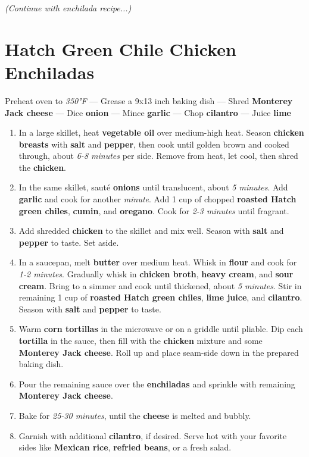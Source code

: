 \documentclass[11pt,letterpaper]{article}
\begin{document}
\textit{(Continue with enchilada recipe...)}

\newpage 

\section*{Hatch Green Chile Chicken Enchiladas}

\noindent
Preheat oven to \textit{350°F} ---
Grease a 9x13 inch baking dish ---
Shred \textbf{Monterey Jack cheese} ---
Dice \textbf{onion} ---
Mince \textbf{garlic} ---
Chop \textbf{cilantro} ---
Juice \textbf{lime}

\begin{enumerate}
    \item In a large skillet, heat \textbf{vegetable oil} over medium-high heat. Season \textbf{chicken breasts} with \textbf{salt} and \textbf{pepper}, then cook until golden brown and cooked through, about \textit{6-8 minutes} per side. Remove from heat, let cool, then shred the \textbf{chicken}.
    
    \item In the same skillet, sauté \textbf{onions} until translucent, about \textit{5 minutes}. Add \textbf{garlic} and cook for another \textit{minute}. Add 1 cup of chopped \textbf{roasted Hatch green chiles}, \textbf{cumin}, and \textbf{oregano}. Cook for \textit{2-3 minutes} until fragrant.
    
    \item Add shredded \textbf{chicken} to the skillet and mix well. Season with \textbf{salt} and \textbf{pepper} to taste. Set aside.
    
    \item In a saucepan, melt \textbf{butter} over medium heat. Whisk in \textbf{flour} and cook for \textit{1-2 minutes}. Gradually whisk in \textbf{chicken broth}, \textbf{heavy cream}, and \textbf{sour cream}. Bring to a simmer and cook until thickened, about \textit{5 minutes}. Stir in remaining 1 cup of \textbf{roasted Hatch green chiles}, \textbf{lime juice}, and \textbf{cilantro}. Season with \textbf{salt} and \textbf{pepper} to taste.
    
    \item Warm \textbf{corn tortillas} in the microwave or on a griddle until pliable. Dip each \textbf{tortilla} in the sauce, then fill with the \textbf{chicken} mixture and some \textbf{Monterey Jack cheese}. Roll up and place seam-side down in the prepared baking dish.
    
    \item Pour the remaining sauce over the \textbf{enchiladas} and sprinkle with remaining \textbf{Monterey Jack cheese}.
    
    \item Bake for \textit{25-30 minutes}, until the \textbf{cheese} is melted and bubbly.
    
    \item Garnish with additional \textbf{cilantro}, if desired. Serve hot with your favorite sides like \textbf{Mexican rice}, \textbf{refried beans}, or a fresh salad.
\end{enumerate}
\end{document}
